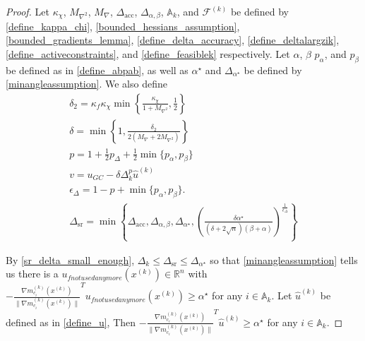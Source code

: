 \documentclass{article}
\theoremstyle{case}
\numberwithin{theorem}{subsection}
\newcommand{\activeconstraintsk}{{\mathbb A_{k}}}
\newcommand{\dacc}{{\Delta_{\textrm{acc}}}}
\newcommand{\deltalargzik}{{\Delta_{\alpha,\beta}}}
\newcommand{\dk}{\Delta_k}
\newcommand{\dsr}{{\Delta_{\textrm{sr}}}}
\newcommand{\feasiblek}{{\mathcal F^{(k)}}}
\newcommand{\gmcik}{{\nabla m_{c_i}^{(k)}\left(\xk\right)}}
\newcommand{\huk}{{{\hat u}^{(k)}}}
\newcommand{\maxgrad}{{M_{\nabla}}}
\newcommand{\maxhessian}{{M_{\nabla^2}}}
\newcommand{\minanglealpha}{{ \alpha^{\star} }}
\newcommand{\minangledelta}{{\Delta_{\alpha^{\star}}}}
\newcommand{\Rn}{\mathbb R^n}
\newcommand{\xk}{{x^{(k)}}}
\newcommand{\minangledir}{{u_{f not used anymore}}}
\begin{document}
\begin{proof}

Let
$\kappa_{\chi}$,
$\maxhessian$,
$\maxgrad$,
$\dacc$,
$\deltalargzik$,
$\activeconstraintsk$,
and $\feasiblek$
be defined by
\cref{define_kappa_chi},
\cref{bounded_hessians_assumption},
\cref{bounded_gradients_lemma},
\cref{define_delta_accuracy},
\cref{define_deltalargzik},
\cref{define_activeconstraints},
and \cref{define_feasiblek}
respectively.
Let $\alpha$, $\beta$ $p_{\alpha}$, and $p_{\beta}$
be defined as in \cref{define_abpab}, as well as $\minanglealpha$ and $\minangledelta$ be defined by \cref{minangleassumption}.
We also define
\begin{align}
\delta_2 = \kappa_f \kappa_{\chi} \min\left\{ \frac{\kappa_{\chi}}{1 + \maxhessian}, \frac 1 2 \right\} \label{define_delta2} \\
\delta = \min\left\{1, \frac{\delta_2}{2\left(\maxgrad + 2\maxhessian\right)}\right\} \label{sr_define_delta} \\
p = 1 + \frac 1 2 p_{\Delta} + \frac 1 2\min\{p_{\alpha}, p_{\beta}\} \label{sr_def_p}\\
v = u_{GC} - \delta \dk^{p} \huk \label{define_v} \\
\epsilon_{\Delta} = 1-p+\min\{p_{\alpha}, p_{\beta}\}. \label{sr_def_epsilon_delta} \\
\dsr = \min\left\{
\dacc,
\deltalargzik,
\minangledelta,
\left(\frac{\delta \minanglealpha}{\left(\delta + 2\sqrt{n}\right)\left(\beta +\alpha\right)}\right)^{\frac 1 {\epsilon_{\Delta}}}
\right\} \label{define_delta_sufficient_reduction}
\end{align}

By \cref{sr_delta_small_enough}, $\dk \le \dsr \le \minangledelta$ so that \cref{minangleassumption}
tells us there is a $ \minangledir\left(\xk\right) \in \Rn$ with $-\frac {\gmcik}{\|\gmcik\|} ^T \minangledir\left(\xk\right) \ge \minanglealpha$ for any $i \in \activeconstraintsk$.
Let $\huk$ be defined as in \cref{define_u},
Then $-\frac {\gmcik}{\|\gmcik\|} ^T\huk \ge \minanglealpha$ for any $i \in \activeconstraintsk$.


\end{proof}
\end{document}
